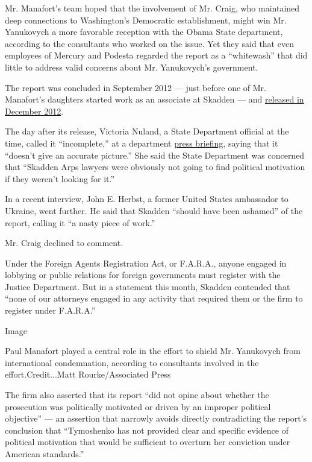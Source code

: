 Mr. Manafort's team hoped that the involvement of Mr. Craig, who
maintained deep connections to Washington's Democratic establishment,
might win Mr. Yanukovych a more favorable reception with the Obama State
department, according to the consultants who worked on the issue. Yet
they said that even employees of Mercury and Podesta regarded the report
as a ``whitewash'' that did little to address valid concerns about Mr.
Yanukovych's government.

The report was concluded in September 2012 --- just before one of Mr.
Manafort's daughters started work as an associate at Skadden --- and
\href{http://www.nytimes.com/2012/12/13/world/europe/failings-found-in-trial-of-ukrainian-ex-premier.html?mcubz=3}{released
in December 2012}.

The day after its release, Victoria Nuland, a State Department official
at the time, called it ``incomplete,'' at a department
\href{https://2009-2017.state.gov/r/pa/prs/dpb/2012/12/202021.htm}{press
briefing}, saying that it ``doesn't give an accurate picture.'' She said
the State Department was concerned that ``Skadden Arps lawyers were
obviously not going to find political motivation if they weren't looking
for it.''

In a recent interview, John E. Herbst, a former United States ambassador
to Ukraine, went further. He said that Skadden ``should have been
ashamed'' of the report, calling it ``a nasty piece of work.''

Mr. Craig declined to comment.

Under the Foreign Agents Registration Act, or F.A.R.A., anyone engaged
in lobbying or public relations for foreign governments must register
with the Justice Department. But in a statement this month, Skadden
contended that ``none of our attorneys engaged in any activity that
required them or the firm to register under F.A.R.A.''

Image

Paul Manafort played a central role in the effort to shield Mr.
Yanukovych from international condemnation, according to consultants
involved in the effort.Credit...Matt Rourke/Associated Press

The firm also asserted that its report ``did not opine about whether the
prosecution was politically motivated or driven by an improper political
objective'' --- an assertion that narrowly avoids directly contradicting
the report's conclusion that ``Tymoshenko has not provided clear and
specific evidence of political motivation that would be sufficient to
overturn her conviction under American standards.''

